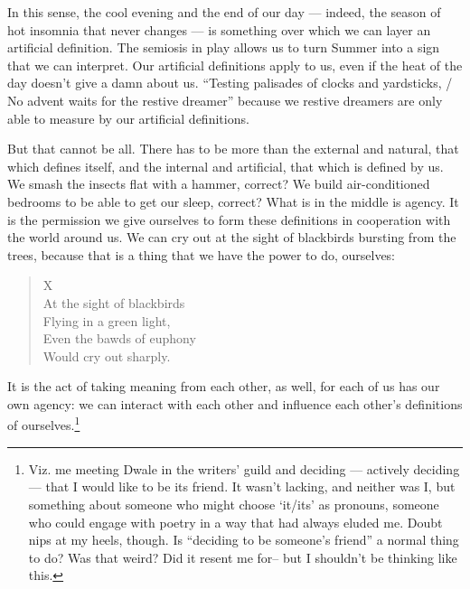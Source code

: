 \documentclass[12pt,oneside]{memoir}
\begin{document}
In this sense, the cool evening and the end of our day --- indeed, the season of hot insomnia that never changes --- is something over which we can layer an artificial definition. The semiosis in play allows us to turn Summer into a sign that we can interpret. Our artificial definitions apply to us, even if the heat of the day doesn't give a damn about us. ``Testing palisades of clocks and yardsticks, / No advent waits for the restive dreamer'' because we restive dreamers are only able to measure by our artificial definitions.

But that cannot be all. There has to be more than the external and natural, that which defines itself, and the internal and artificial, that which is defined by us. We smash the insects flat with a hammer, correct? We build air-conditioned bedrooms to be able to get our sleep, correct? What is in the middle is agency. It is the permission we give ourselves to form these definitions in cooperation with the world around us. We can cry out at the sight of blackbirds bursting from the trees, because that is a thing that we have the power to do, ourselves:

\begin{verse}
X \\
At the sight of blackbirds \\
Flying in a green light, \\
Even the bawds of euphony \\
Would cry out sharply.

\parencite{blackbird}
\end{verse}

It is the act of taking meaning from each other, as well, for each of us has our own agency: we can interact with each other and influence each other's definitions of ourselves.\footnote{Viz. me meeting Dwale in the writers' guild and deciding --- actively deciding --- that I would like to be its friend. It wasn't lacking, and neither was I, but something about someone who might choose `it/its' as pronouns, someone who could engage with poetry in a way that had always eluded me. Doubt nips at my heels, though. Is ``deciding to be someone's friend'' a normal thing to do? Was that weird? Did it resent me for-- but I shouldn't be thinking like this.}
\end{document}
